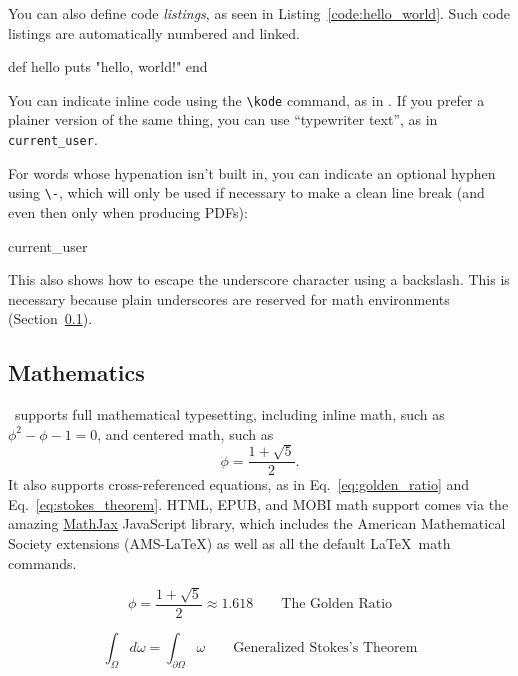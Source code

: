 You can also define code \emph{listings}, as seen in Listing~\ref{code:hello_world}. Such code listings are automatically numbered and linked.

\begin{codelisting}
\label{code:hello_world}
\begin{code}
def hello
  puts "hello, world!"
end
\end{code}
\end{codelisting}

You can indicate inline code using the \verb+\kode+ command, as in . If you prefer a plainer version of the same thing, you can use ``typewriter text'', as in \texttt{current\_\-user}.

For words whose hypenation isn't built in, you can indicate an optional hyphen using \verb+\-+, which will only be used if necessary to make a clean line break (and even then only when producing PDFs):
\begin{code}
current\_\-user
\end{code}
This also shows how to escape the underscore character using a backslash. This is necessary because plain underscores are reserved for math environments (Section~\ref{sec:mathematics}).

\subsection{Mathematics}
\label{sec:mathematics}

\PolyTeXnic\ supports full mathematical typesetting, including inline math, such as $\phi^2 - \phi - 1 = 0$, and centered math, such as
\[ \phi = \frac{1+\sqrt{5}}{2}. \]
It also supports cross-referenced equations, as in Eq.~\eqref{eq:golden_ratio} and Eq.~\eqref{eq:stokes_theorem}. HTML, EPUB, and MOBI math support comes via the amazing \href{http://www.mathjax.org/}{MathJax} JavaScript library, which includes the American Mathematical Society extensions (AMS-\LaTeX) as well as all the default \LaTeX\ math commands.

\begin{equation}
\label{eq:golden_ratio}
\phi = \frac{1+\sqrt{5}}{2} \approx 1.618 \qquad{\text{The Golden Ratio}}
\end{equation}

\begin{equation}
\label{eq:stokes_theorem}
\int_\Omega d\omega = \int_{\partial\Omega} \omega \qquad{\text{Generalized Stokes's Theorem}}
\end{equation}

